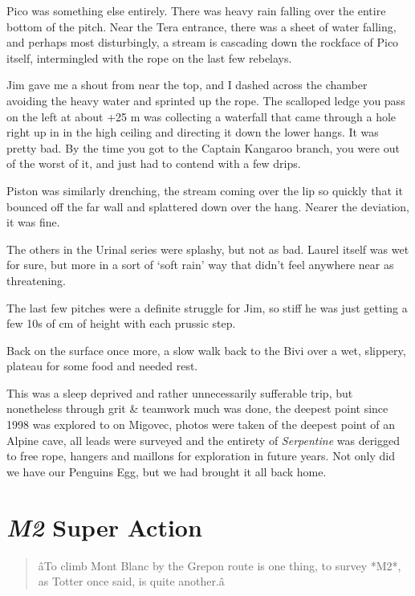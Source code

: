 Pico was something else entirely. There was heavy rain falling over the
entire bottom of the pitch. Near the Tera entrance, there was a sheet of
water falling, and perhaps most disturbingly, a stream is cascading down
the rockface of Pico itself, intermingled with the rope on the last few
rebelays.

Jim gave me a shout from near the top, and I dashed across the chamber
avoiding the heavy water and sprinted up the rope. The scalloped ledge
you pass on the left at about +25 m was collecting a waterfall that came
through a hole right up in in the high ceiling and directing it down the
lower hangs. It was pretty bad. By the time you got to the Captain
Kangaroo branch, you were out of the worst of it, and just had to
contend with a few drips.

Piston was similarly drenching, the stream coming over the lip so
quickly that it bounced off the far wall and splattered down over the
hang. Nearer the deviation, it was fine.

The others in the Urinal series were splashy, but not as bad. Laurel
itself was wet for sure, but more in a sort of `soft rain' way that
didn't feel anywhere near as threatening.

The last few pitches were a definite struggle for Jim, so stiff he was
just getting a few 10s of cm of height with each prussic step.

Back on the surface once more, a slow walk back to the Bivi over a wet,
slippery, plateau for some food and needed rest.

This was a sleep deprived and rather unnecessarily sufferable trip, but
nonetheless through grit \& teamwork much was done, the deepest point
since 1998 was explored to on Migovec, photos were taken of the deepest
point of an Alpine cave, all leads were surveyed and the entirety of
\emph{Serpentine} was derigged to free rope, hangers and maillons for
exploration in future years. Not only did we have our Penguins Egg, but
we had brought it all back home.


\hypertarget{m2-super-action}{%
\section{\texorpdfstring{\emph{M2} Super
Action}{M2 Super Action}}\label{m2-super-action}}

\begin{verse}
âTo climb Mont Blanc by the Grepon route is one thing, to survey *M2*, as Totter once said, is quite another.â
\end{verse}

